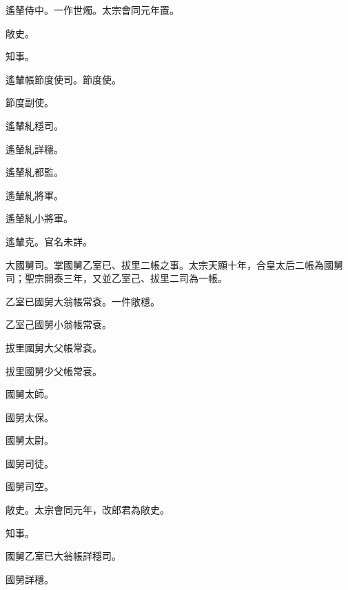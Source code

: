 \begin{pinyinscope}
 遙輦侍中。一作世燭。太宗會同元年置。



 敞史。



 知事。



 遙輦帳節度使司。節度使。



 節度副使。



 遙輦糺穩司。



 遙輦糺詳穩。



 遙輦糺都監。



 遙輦糺將軍。



 遙輦糺小將軍。



 遙輦克。官名未詳。



 大國舅司。掌國舅乙室已、拔里二帳之事。太宗天顯十年，合皇太后二帳為國舅司；聖宗開泰三年，又並乙室己、拔里二司為一帳。



 乙室已國舅大翁帳常袞。一件敞穩。



 乙室己國舅小翁帳常袞。



 拔里國舅大父帳常袞。



 拔里國舅少父帳常袞。



 國舅太師。



 國舅太保。



 國舅太尉。



 國舅司徒。



 國舅司空。



 敞史。太宗會同元年，改郎君為敞史。



 知事。



 國舅乙室已大翁帳詳穩司。



 國舅詳穩。




\end{pinyinscope}
